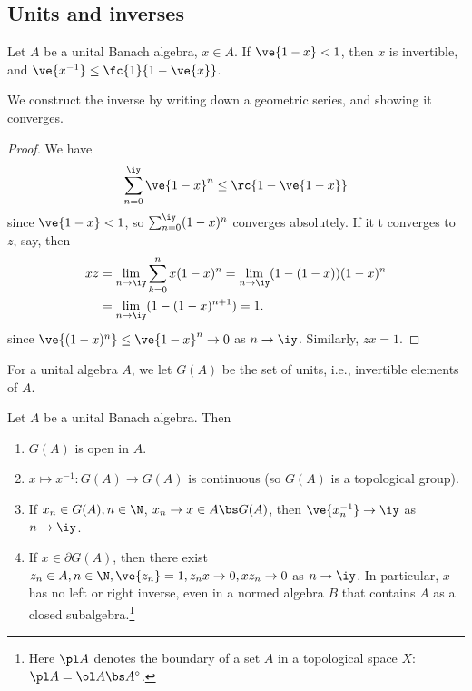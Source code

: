 \subsection{Units and inverses}
\begin{lem}
Let $A$ be a unital Banach algebra, $x\in A$. If $\ve{1-x}<1$, then $x$ is invertible, and $\ve{x^{-1}}\le \fc{1}{1-\ve{x}}$.
\end{lem}
We construct the inverse by writing down a geometric series, and showing it converges.
\begin{proof}
We have
\[
\sum_{n=0}^{\iy}\ve{1-x}^n \le \rc{1-\ve{1-x}}
\]
since $\ve{1-x}<1$, so $\sum_{n=0}^{\iy} (1-x)^n$ converges absolutely. If it t converges to $z$, say, then
\begin{align*}
xz&=\lim_{n\to\iy} \sum_{k=0}^n x(1-x)^n=\lim_{n\to \iy} (1-(1-x))(1-x)^n\\
&=\lim_{n\to \iy}(1-(1-x)^{n+1})=1.
\end{align*}
since $\ve{(1-x)^n} \le\ve{1-x}^n\to 0$ as $n\to \iy$. Similarly, $zx=1$.
\end{proof}
\begin{df}
For a unital algebra $A$, we let $G(A)$ be the set of units, i.e., invertible elements of $A$.
\end{df}
\begin{cor}
Let $A$ be a unital Banach algebra. Then 
\begin{enumerate}
\item
$G(A)$ is open in $A$.
\item
$x\mapsto x^{-1}:G(A)\to G(A)$ is continuous (so $G(A)$ is a topological group).
\item
If $x_n\in G(A),n\in \N$, $x_n\to x\in A\bs G(A)$, then $\ve{x_n^{-1}}\to \iy$ as $n\to \iy$. 
\item
{} If $x\in \partial
G(A)$, then there exist $z_n\in A,n\in \N, \ve{z_n}=1, z_nx\to 0, xz_n\to 0$ as $n\to \iy$. In particular, $x$ has no left or right inverse, even in a normed algebra $B$ that contains $A$ as a closed subalgebra.\footnote{Here $\pl A$ denotes the boundary of a set $A$ in a topological space $X$: $\pl A=\ol A\bs A^{\circ}$.}
\end{enumerate}
\end{cor}
